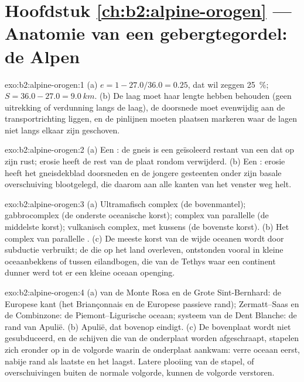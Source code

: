 \section*{Hoofdstuk \ref{ch:b2:alpine-orogen} --- Anatomie van een gebergtegordel: de Alpen}

\begin{solution}{exo:b2:alpine-orogen:1}
(a) $e = 1 - 27.0/36.0 = 0.25$, dat wil zeggen \qty{25}{\percent}; $S = 36.0 - 27.0 =
\qty{9.0}{km}$. (b) De laag moet haar lengte hebben behouden (geen uitrekking of verdunning langs de laag),
de doorsnede moet evenwijdig aan de transportrichting liggen, en de pinlijnen moeten plaatsen markeren
waar de lagen niet langs elkaar zijn geschoven.
\end{solution}

\begin{solution}{exo:b2:alpine-orogen:2}
(a) Een : de gneis is een geïsoleerd restant van een  dat op zijn  rust;
erosie heeft de rest van de plaat rondom verwijderd. (b) Een : erosie heeft
het gneisdekblad doorsneden en de jongere gesteenten onder zijn basale overschuiving blootgelegd, die
daarom aan alle kanten van het venster weg helt.
\end{solution}

\begin{solution}{exo:b2:alpine-orogen:3}
(a) Ultramafisch complex (de bovenmantel); gabbrocomplex (de onderste oceanische korst);
complex van parallelle  (de middelste korst); vulkanisch complex, met kussens (de bovenste korst).
(b) Het complex van parallelle . (c) De meeste korst van de wijde oceanen wordt door subductie verbruikt;
de  die op het land overleven, ontstonden vooral in kleine oceaanbekkens of tussen
eilandbogen, die van de Tethys waar een continent dunner werd tot er een kleine oceaan openging.
\end{solution}

\begin{solution}{exo:b2:alpine-orogen:4}
(a)  van de Monte Rosa en de Grote Sint-Bernhard: de Europese kant (het Briançonnais en de
Europese passieve rand); Zermatt--Saas en de Combinzone: de Piemont--Ligurische oceaan; systeem van de Dent
Blanche: de rand van Apulië. (b) Apulië, dat bovenop eindigt. (c) De bovenplaat wordt
niet gesubduceerd, en de schijven die van de onderplaat worden afgeschraapt, stapelen zich eronder op in de volgorde waarin de
onderplaat aankwam: verre oceaan eerst, nabije rand als laatste en het laagst. Latere plooiing van de stapel,
of overschuivingen buiten de normale volgorde, kunnen de volgorde verstoren.
\end{solution}

